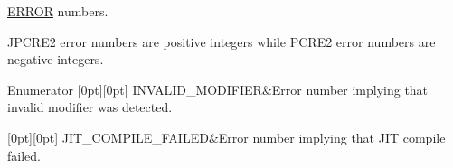 \hyperlink{namespacejpcre2_1_1ERROR}{E\+R\+R\+OR} numbers. 

J\+P\+C\+R\+E2 error numbers are positive integers while P\+C\+R\+E2 error numbers are negative integers. \begin{DoxyEnumFields}{Enumerator}
[0pt][0pt]{}\hypertarget{namespacejpcre2_1_1ERROR_a4b2998984439438fa9da8d7043909bc2_a4b2998984439438fa9da8d7043909bc2a4115340549b623f4e2da285bf0aa9bff}{}\label{namespacejpcre2_1_1ERROR_a4b2998984439438fa9da8d7043909bc2_a4b2998984439438fa9da8d7043909bc2a4115340549b623f4e2da285bf0aa9bff} 
I\+N\+V\+A\+L\+I\+D\+\_\+\+M\+O\+D\+I\+F\+I\+ER&Error number implying that invalid modifier was detected. \\
\hline

[0pt][0pt]{}\hypertarget{namespacejpcre2_1_1ERROR_a4b2998984439438fa9da8d7043909bc2_a4b2998984439438fa9da8d7043909bc2aa116db5c7b638480ccad3ae938d33c3e}{}\label{namespacejpcre2_1_1ERROR_a4b2998984439438fa9da8d7043909bc2_a4b2998984439438fa9da8d7043909bc2aa116db5c7b638480ccad3ae938d33c3e} 
J\+I\+T\+\_\+\+C\+O\+M\+P\+I\+L\+E\+\_\+\+F\+A\+I\+L\+ED&Error number implying that J\+IT compile failed. \\
\hline

\end{DoxyEnumFields}
